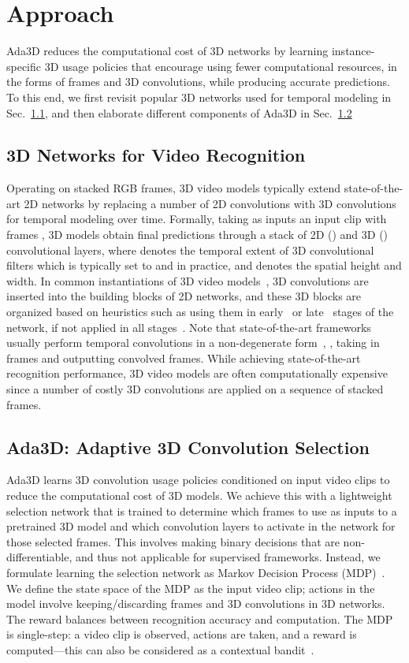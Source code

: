 \documentclass[final]{cvpr}
\newcommand{\system}{{Ada3D}\xspace}
\begin{document}
 
\section{Approach}
\system reduces the computational cost of 3D networks by learning instance-specific 3D usage policies that encourage using fewer computational resources, in the forms of frames and 3D convolutions, while producing accurate predictions. To this end, we first revisit popular 3D networks used for temporal modeling in Sec.~\ref{sec:3d}, and then elaborate different components of \system in Sec.~\ref{sec:ada3d}


\subsection{3D Networks for Video Recognition}
\label{sec:3d}
Operating on stacked RGB frames, 3D video models typically extend state-of-the-art 2D networks by replacing a number of 2D convolutions with 3D convolutions for temporal modeling over time. Formally, taking as inputs an input clip  with  frames , 3D models obtain final predictions through a stack of 2D () and 3D () convolutional layers, where  denotes the temporal extent of 3D convolutional filters which is typically set to  and  in practice, and  denotes the spatial height and width. In common instantiations of 3D video models~\cite{c3d,r21d,quovadis,s3d,slowfast,x3d}, 3D convolutions are inserted into the building blocks of 2D networks, and these 3D blocks are organized based on heuristics such as using them in early~\cite{s3d,r21d} or late~\cite{slowfast,s3d,tpn} stages of the network, if not applied in all stages~\cite{quovadis,x3d,r21d,c3d}. 
Note that state-of-the-art frameworks usually perform temporal convolutions in a non-degenerate form~\cite{slowfast,x3d}, \ie, taking in  frames and outputting   convolved frames.
While achieving state-of-the-art recognition performance, 3D video models are often computationally expensive since a number of costly 3D convolutions are applied on a sequence of stacked frames. 


\subsection{\system: Adaptive 3D Convolution Selection}
\label{sec:ada3d}
\system learns 3D convolution usage policies conditioned on input video clips to reduce the computational cost of 3D models. We achieve this with a lightweight selection network that is trained to determine which frames to use as inputs to a pretrained 3D model and which convolution layers to activate in the network for those selected frames. 
This involves making binary decisions that are non-differentiable, and thus not applicable for supervised frameworks. Instead, we formulate learning the selection network as Markov Decision Process (MDP)~\cite{mdp}. We define the state space of the MDP as the input video clip; actions in the model involve keeping/discarding frames and 3D convolutions in 3D networks. The reward balances between recognition accuracy and computation.
The MDP is single-step: a video clip is observed, actions are taken, and a reward is computed---this can also be considered as a contextual bandit~\cite{bandit}.
\end{document}
